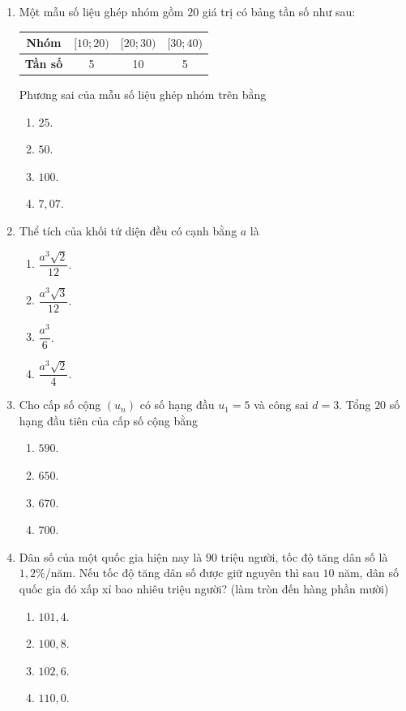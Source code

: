 \documentclass[12pt,a4paper]{article}
\begin{document}
\begin{enumerate}[label=\textbf{Câu \arabic*:}, leftmargin=*]
\item Một mẫu số liệu ghép nhóm gồm $20$ giá trị có bảng tần số như sau:
\begin{center}
\begin{tabular}{|c|c|c|c|}
\hline
\textbf{Nhóm} & $[10; 20)$ & $[20; 30)$ & $[30; 40)$ \\ \hline
\textbf{Tần số} & 5 & 10 & 5 \\ \hline
\end{tabular}
\end{center}
Phương sai của mẫu số liệu ghép nhóm trên bằng
\begin{enumerate}[label=\Alph*.]
    \item $25$.
    \item $50$.
    \item $100$.
    \item $7{,}07$.
\end{enumerate}

\item Thể tích của khối tứ diện đều có cạnh bằng $a$ là
\begin{enumerate}[label=\Alph*.]
    \item $\dfrac{a^3\sqrt{2}}{12}$.
    \item $\dfrac{a^3\sqrt{3}}{12}$.
    \item $\dfrac{a^3}{6}$.
    \item $\dfrac{a^3\sqrt{2}}{4}$.
\end{enumerate}

\item Cho cấp số cộng $(u_n)$ có số hạng đầu $u_1 = 5$ và công sai $d = 3$. Tổng $20$ số hạng đầu tiên của cấp số cộng bằng
\begin{enumerate}[label=\Alph*.]
    \item $590$.
    \item $650$.
    \item $670$.
    \item $700$.
\end{enumerate}

\item Dân số của một quốc gia hiện nay là $90$ triệu người, tốc độ tăng dân số là $1{,}2\%$/năm. Nếu tốc độ tăng dân số được giữ nguyên thì sau $10$ năm, dân số quốc gia đó xấp xỉ bao nhiêu triệu người? (làm tròn đến hàng phần mười)
\begin{enumerate}[label=\Alph*.]
    \item $101{,}4$.
    \item $100{,}8$.
    \item $102{,}6$.
    \item $110{,}0$.
\end{enumerate}


\end{enumerate}
\end{document}
